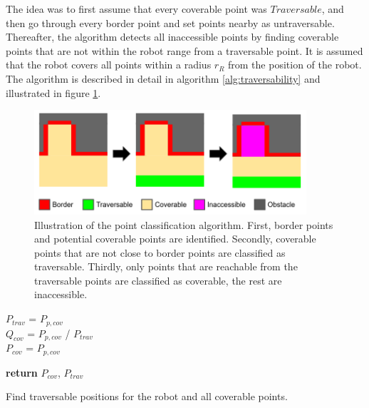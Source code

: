 The idea was to first assume that every coverable point was $Traversable$, and then go through every border point and set points nearby as untraversable. Thereafter, the algorithm detects all inaccessible points by finding coverable points that are not within the robot range from a traversable point. It is assumed that the robot covers all points within a radius $r_R$ from the position of the robot. The algorithm is described in detail in algorithm \ref{alg:traversability} and illustrated in figure \ref{fig:pointclassification}.

\begin{figure}
    \centering
    \includegraphics[width=0.9\textwidth]{figures/pointclassification.png}
    \caption{Illustration of the point classification algorithm. First, border points and potential coverable points are identified. Secondly, coverable points that are not close to border points are classified as traversable. Thirdly, only points that are reachable from the traversable points are classified as coverable, the rest are inaccessible.}
    \label{fig:pointclassification}
\end{figure}

\begin{algorithm}[H]
\SetAlgoLined
{}
$P_{trav}$ = $P_{p, cov}$ \\
$Q_{cov}$ = $P_{p, cov}$ / $P_{trav}$ \\
$P_{cov}$ = $P_{p, cov}$ \\

\textup{\textbf{return} $P_{cov}$, $P_{trav}$ } 
 \caption{Find traversable positions for the robot and all coverable points.}
 \label{alg:traversability}
\end{algorithm}

